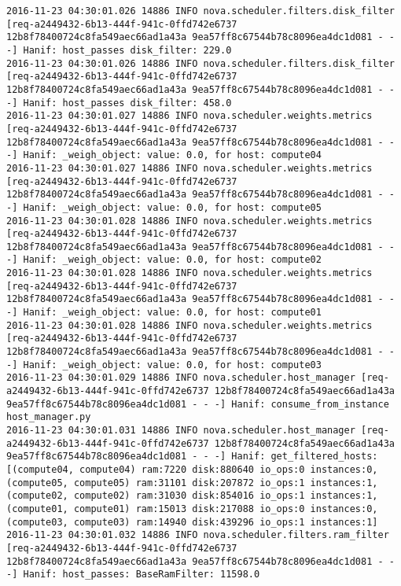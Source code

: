 \begin{lstlisting}[frame=single, caption={The filter scheduler log trace for 10 virtual instances}, label={lst:filterschedulercodetracelog10vi}, escapechar=|]
2016-11-23 04:30:01.026 14886 INFO nova.scheduler.filters.disk_filter [req-a2449432-6b13-444f-941c-0ffd742e6737 12b8f78400724c8fa549aec66ad1a43a 9ea57ff8c67544b78c8096ea4dc1d081 - - -] Hanif: host_passes disk_filter: 229.0
2016-11-23 04:30:01.026 14886 INFO nova.scheduler.filters.disk_filter [req-a2449432-6b13-444f-941c-0ffd742e6737 12b8f78400724c8fa549aec66ad1a43a 9ea57ff8c67544b78c8096ea4dc1d081 - - -] Hanif: host_passes disk_filter: 458.0
2016-11-23 04:30:01.027 14886 INFO nova.scheduler.weights.metrics [req-a2449432-6b13-444f-941c-0ffd742e6737 12b8f78400724c8fa549aec66ad1a43a 9ea57ff8c67544b78c8096ea4dc1d081 - - -] Hanif: _weigh_object: value: 0.0, for host: compute04
2016-11-23 04:30:01.027 14886 INFO nova.scheduler.weights.metrics [req-a2449432-6b13-444f-941c-0ffd742e6737 12b8f78400724c8fa549aec66ad1a43a 9ea57ff8c67544b78c8096ea4dc1d081 - - -] Hanif: _weigh_object: value: 0.0, for host: compute05
2016-11-23 04:30:01.028 14886 INFO nova.scheduler.weights.metrics [req-a2449432-6b13-444f-941c-0ffd742e6737 12b8f78400724c8fa549aec66ad1a43a 9ea57ff8c67544b78c8096ea4dc1d081 - - -] Hanif: _weigh_object: value: 0.0, for host: compute02
2016-11-23 04:30:01.028 14886 INFO nova.scheduler.weights.metrics [req-a2449432-6b13-444f-941c-0ffd742e6737 12b8f78400724c8fa549aec66ad1a43a 9ea57ff8c67544b78c8096ea4dc1d081 - - -] Hanif: _weigh_object: value: 0.0, for host: compute01
2016-11-23 04:30:01.028 14886 INFO nova.scheduler.weights.metrics [req-a2449432-6b13-444f-941c-0ffd742e6737 12b8f78400724c8fa549aec66ad1a43a 9ea57ff8c67544b78c8096ea4dc1d081 - - -] Hanif: _weigh_object: value: 0.0, for host: compute03
2016-11-23 04:30:01.029 14886 INFO nova.scheduler.host_manager [req-a2449432-6b13-444f-941c-0ffd742e6737 12b8f78400724c8fa549aec66ad1a43a 9ea57ff8c67544b78c8096ea4dc1d081 - - -] Hanif: consume_from_instance host_manager.py
2016-11-23 04:30:01.031 14886 INFO nova.scheduler.host_manager [req-a2449432-6b13-444f-941c-0ffd742e6737 12b8f78400724c8fa549aec66ad1a43a 9ea57ff8c67544b78c8096ea4dc1d081 - - -] Hanif: get_filtered_hosts: [(compute04, compute04) ram:7220 disk:880640 io_ops:0 instances:0, (compute05, compute05) ram:31101 disk:207872 io_ops:1 instances:1, (compute02, compute02) ram:31030 disk:854016 io_ops:1 instances:1, (compute01, compute01) ram:15013 disk:217088 io_ops:0 instances:0, (compute03, compute03) ram:14940 disk:439296 io_ops:1 instances:1]
2016-11-23 04:30:01.032 14886 INFO nova.scheduler.filters.ram_filter [req-a2449432-6b13-444f-941c-0ffd742e6737 12b8f78400724c8fa549aec66ad1a43a 9ea57ff8c67544b78c8096ea4dc1d081 - - -] Hanif: host_passes: BaseRamFilter: 11598.0

\end{lstlisting}
